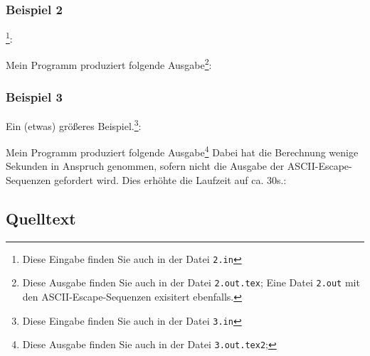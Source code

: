 \subsubsection{Beispiel 2}
\footnote{Diese Eingabe finden Sie auch in der Datei \texttt{2.in}}:
{\small

}
Mein Programm produziert folgende Ausgabe\footnote{Diese Ausgabe finden Sie auch in der Datei \texttt{2.out.tex}; Eine Datei \texttt{2.out} mit den ASCII-Escape-Sequenzen exisitert ebenfalls.}:\\
{\ttfamily \small

}
\subsubsection{Beispiel 3}
Ein (etwas) größeres Beispiel.\footnote{Diese Eingabe finden Sie auch in der Datei \texttt{3.in}}:
{\small

}
Mein Programm produziert folgende Ausgabe\footnote{Diese Ausgabe finden Sie auch in der Datei \texttt{3.out.tex2};} Dabei hat die Berechnung wenige Sekunden in Anspruch genommen, sofern nicht die Ausgabe der ASCII-Escape-Sequenzen gefordert wird. Dies erhöhte die Laufzeit auf ca. 30s.:\\
{\ttfamily \small

}

\subsection{Quelltext}
{\small

}